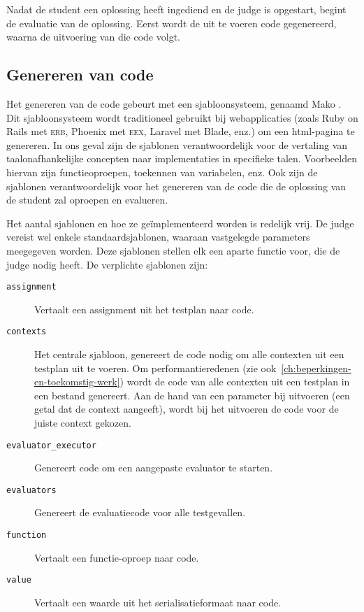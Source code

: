 Nadat de student een oplossing heeft ingediend en de judge is opgestart, begint de evaluatie van de oplossing.
Eerst wordt de uit te voeren code gegenereerd, waarna de uitvoering van die code volgt.

\subsection{Genereren van code}\label{subsec:genereren-van-code}

Het genereren van de code gebeurt met een sjabloonsysteem, genaamd Mako \autocite{mako}.
Dit sjabloonsysteem wordt traditioneel gebruikt bij webapplicaties (zoals Ruby on Rails met \textsc{erb}, Phoenix met \textsc{eex}, Laravel met Blade, enz.) om een html-pagina te genereren.
In ons geval zijn de sjablonen verantwoordelijk voor de vertaling van taalonafhankelijke concepten naar implementaties in specifieke talen.
Voorbeelden hiervan zijn functieoproepen, toekennen van variabelen, enz.
Ook zijn de sjablonen verantwoordelijk voor het genereren van de code die de oplossing van de student zal oproepen en evalueren.

Het aantal sjablonen en hoe ze geïmplementeerd worden is redelijk vrij.
De judge vereist wel enkele standaardsjablonen, waaraan vastgelegde parameters meegegeven worden.
Deze sjablonen stellen elk een aparte functie voor, die de judge nodig heeft.
De verplichte sjablonen zijn:
\begin{description}
    \item[\texttt{assignment}] Vertaalt een assignment uit het testplan naar code.
    \item[\texttt{contexts}] Het centrale sjabloon, genereert de code nodig om alle contexten uit een testplan uit te voeren.
    Om performantieredenen (zie ook~\cref{ch:beperkingen-en-toekomstig-werk}) wordt de code van alle contexten uit een testplan in een bestand genereert.
    Aan de hand van een parameter bij uitvoeren (een getal dat de context aangeeft), wordt bij het uitvoeren de code voor de juiste context gekozen.
    \item[\texttt{evaluator\_executor}] Genereert code om een aangepaste evaluator te starten.
    \item[\texttt{evaluators}] Genereert de evaluatiecode voor alle testgevallen.
    \item[\texttt{function}] Vertaalt een functie-oproep naar code.
    \item[\texttt{value}] Vertaalt een waarde uit het serialisatieformaat naar code.
\end{description}


